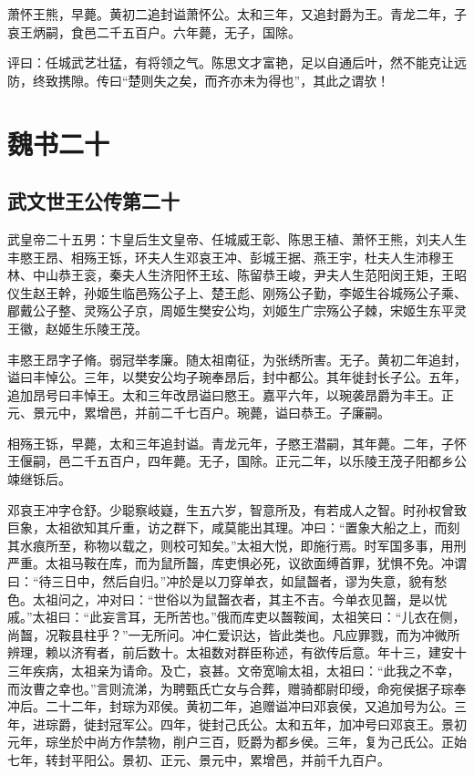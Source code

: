 \documentclass[12pt,UTF8]{ctexbook}
\begin{document}
萧怀王熊，早薨。黄初二追封谥萧怀公。太和三年，又追封爵为王。青龙二年，子哀王炳嗣，食邑二千五百户。六年薨，无子，国除。

评曰：任城武艺壮猛，有将领之气。陈思文才富艳，足以自通后叶，然不能克让远防，终致携隙。传曰“楚则失之矣，而齐亦未为得也”，其此之谓欤！

\part{魏书二十}
\chapter{武文世王公传第二十}

武皇帝二十五男：卞皇后生文皇帝、任城威王彰、陈思王植、萧怀王熊，刘夫人生丰愍王昂、相殇王铄，环夫人生邓哀王冲、彭城王据、燕王宇，杜夫人生沛穆王林、中山恭王衮，秦夫人生济阳怀王玹、陈留恭王峻，尹夫人生范阳闵王矩，王昭仪生赵王幹，孙姬生临邑殇公子上、楚王彪、刚殇公子勤，李姬生谷城殇公子乘、郿戴公子整、灵殇公子京，周姬生樊安公均，刘姬生广宗殇公子棘，宋姬生东平灵王徽，赵姬生乐陵王茂。

丰愍王昂字子脩。弱冠举孝廉。随太祖南征，为张绣所害。无子。黄初二年追封，谥曰丰悼公。三年，以樊安公均子琬奉昂后，封中都公。其年徙封长子公。五年，追加昂号曰丰悼王。太和三年改昂谥曰愍王。嘉平六年，以琬袭昂爵为丰王。正元、景元中，累增邑，并前二千七百户。琬薨，谥曰恭王。子廉嗣。

相殇王铄，早薨，太和三年追封谥。青龙元年，子愍王潜嗣，其年薨。二年，子怀王偃嗣，邑二千五百户，四年薨。无子，国除。正元二年，以乐陵王茂子阳都乡公竦继铄后。

邓哀王冲字仓舒。少聪察岐嶷，生五六岁，智意所及，有若成人之智。时孙权曾致巨象，太祖欲知其斤重，访之群下，咸莫能出其理。冲曰：“置象大船之上，而刻其水痕所至，称物以载之，则校可知矣。”太祖大悦，即施行焉。时军国多事，用刑严重。太祖马鞍在库，而为鼠所齧，库吏惧必死，议欲面缚首罪，犹惧不免。冲谓曰：“待三日中，然后自归。”冲於是以刀穿单衣，如鼠齧者，谬为失意，貌有愁色。太祖问之，冲对曰：“世俗以为鼠齧衣者，其主不吉。今单衣见齧，是以忧戚。”太祖曰：“此妄言耳，无所苦也。”俄而库吏以齧鞍闻，太祖笑曰：“儿衣在侧，尚齧，况鞍县柱乎？”一无所问。冲仁爱识达，皆此类也。凡应罪戮，而为冲微所辨理，赖以济宥者，前后数十。太祖数对群臣称述，有欲传后意。年十三，建安十三年疾病，太祖亲为请命。及亡，哀甚。文帝宽喻太祖，太祖曰：“此我之不幸，而汝曹之幸也。”言则流涕，为聘甄氏亡女与合葬，赠骑都尉印绶，命宛侯据子琮奉冲后。二十二年，封琮为邓侯。黄初二年，追赠谥冲曰邓哀侯，又追加号为公。三年，进琮爵，徙封冠军公。四年，徙封己氏公。太和五年，加冲号曰邓哀王。景初元年，琮坐於中尚方作禁物，削户三百，贬爵为都乡侯。三年，复为己氏公。正始七年，转封平阳公。景初、正元、景元中，累增邑，并前千九百户。
\end{document}
